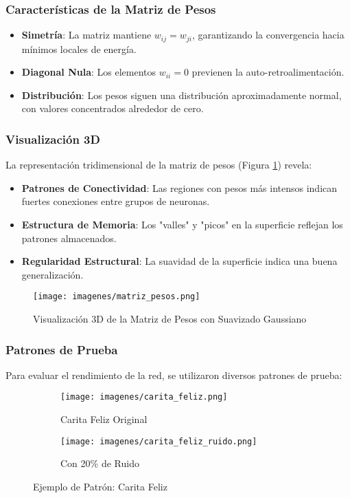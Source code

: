 \documentclass{article}
\begin{document}
\subsubsection{Características de la Matriz de Pesos}
\begin{itemize}
    \item \textbf{Simetría}: La matriz mantiene \(w_{ij} = w_{ji}\), garantizando la convergencia hacia mínimos locales de energía.
    \item \textbf{Diagonal Nula}: Los elementos \(w_{ii} = 0\) previenen la auto-retroalimentación.
    \item \textbf{Distribución}: Los pesos siguen una distribución aproximadamente normal, con valores concentrados alrededor de cero.
\end{itemize}

\subsubsection{Visualización 3D}
La representación tridimensional de la matriz de pesos (Figura \ref{fig:matriz_pesos}) revela:
\begin{itemize}
    \item \textbf{Patrones de Conectividad}: Las regiones con pesos más intensos indican fuertes conexiones entre grupos de neuronas.
    \item \textbf{Estructura de Memoria}: Los "valles" y "picos" en la superficie reflejan los patrones almacenados.
    \item \textbf{Regularidad Estructural}: La suavidad de la superficie indica una buena generalización.
\end{itemize}

\begin{figure}[h]
    \centering
    \texttt{[image: imagenes/matriz\_pesos.png]}
    \caption{Visualización 3D de la Matriz de Pesos con Suavizado Gaussiano}
    \label{fig:matriz_pesos}
\end{figure}

\subsubsection{Patrones de Prueba}
Para evaluar el rendimiento de la red, se utilizaron diversos patrones de prueba:

\begin{figure}[h]
    \centering
    \begin{subfigure}[b]{0.3\textwidth}
        \texttt{[image: imagenes/carita\_feliz.png]}
        \caption{Carita Feliz Original}
    \end{subfigure}
    \begin{subfigure}[b]{0.3\textwidth}
        \texttt{[image: imagenes/carita\_feliz\_ruido.png]}
        \caption{Con 20\% de Ruido}
    \end{subfigure}
    \caption{Ejemplo de Patrón: Carita Feliz}
    \label{fig:carita}
\end{figure}
\end{document}
